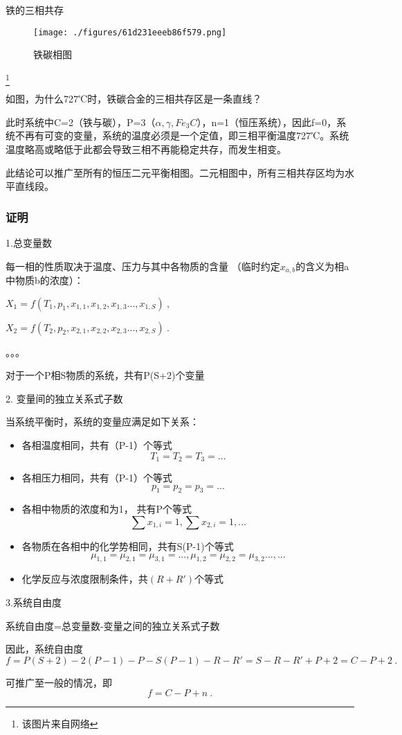 \begin{example}{铁的三相共存}
\begin{figure}[ht]
\centering
\texttt{[image: ./figures/61d231eeeb86f579.png]}
\caption{铁碳相图} \label{fig_GBPL_1}
\end{figure}
\footnote{该图片来自网络}

如图，为什么727℃时，铁碳合金的三相共存区是一条直线？

此时系统中C=2（铁与碳），P=3（$\alpha, \gamma, Fe_3C$），n=1（恒压系统），因此f=0，系统不再有可变的变量，系统的温度必须是一个定值，即三相平衡温度727℃。系统温度略高或略低于此都会导致三相不再能稳定共存，而发生相变。

此结论可以推广至所有的恒压二元平衡相图。二元相图中，所有三相共存区均为水平直线段。
\end{example}

\subsubsection{证明}
1.总变量数

每一相的性质取决于温度、压力与其中各物质的含量 （临时约定$x_{a,b}$的含义为相a中物质b的浓度）：

$X_1=f(T_1, p_1,x_{1,1},x_{1,2},x_{1,3}...,x_{1,S})~,$

$X_2=f(T_2,p_2,x_{2,1},x_{2,2},x_{2,3}...,x_{2,S})~.$

。。。

对于一个P相S物质的系统，共有P(S+2)个变量

2. 变量间的独立关系式子数

当系统平衡时，系统的变量应满足如下关系：

\begin{itemize}
\item 各相温度相同，共有（P-1）个等式
\begin{equation}
T_1=T_2=T_3=...
\end{equation}
\item 各相压力相同，共有（P-1）个等式
\begin{equation}
p_1=p_2=p_3=...
\end{equation}
\item 各相中物质的浓度和为1， 共有P个等式
\begin{equation}
\sum x_{1,i} = 1, \sum x_{2,i} = 1, ...
\end{equation}
\item 各物质在各相中的化学势相同，共有S(P-1)个等式
\begin{equation}
\mu_{1,1}=\mu_{2,1}=\mu_{3,1}=..., \mu_{1,2}=\mu_{2,2}=\mu_{3,2}..., ...
\end{equation}
\item 化学反应与浓度限制条件，共$(R+R')$个等式
\end{itemize}

3.系统自由度

系统自由度=总变量数-变量之间的独立关系式子数

因此，系统自由度 
\begin{equation}
f = P(S+2) - 2(P-1) - P - S(P-1)-R-R'=S-R-R'+P+2=C-P+2~.
\end{equation}

可推广至一般的情况，即
\begin{equation}
f = C-P+n~.
\end{equation}
